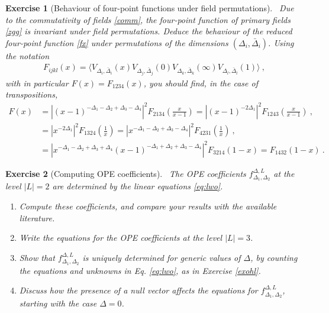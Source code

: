 \documentclass[12pt, a4paper, notitlepage, twoside]{report}
\numberwithin{equation}{section}
\theoremstyle{break}
\newtheorem{exo}{Exercise}[chapter]
\begin{document}
\begin{exo}[Behaviour of four-point functions under field permutations]
 ~\label{exoperm}
Due to the commutativity of fields \eqref{comm}, the four-point function of primary fields \eqref{zgg} is invariant under field permutations. Deduce the behaviour of the reduced four-point function \eqref{fx} under permutations of the dimensions $(\Delta_i,\bar \Delta_i)$. Using the notation 
\begin{align}
 F_{ijkl}(x) =\Big\langle V_{\Delta_i,\bar\Delta_i}(x)V_{\Delta_j,\bar\Delta_j}(0)V_{\Delta_k,\bar\Delta_k}(\infty) V_{\Delta_l,\bar\Delta_l}(1)\Big\rangle \ ,
\end{align}
with in particular $F(x) = F_{1234}(x)$, you should find, in the case of transpositions, 
\begin{align}
 F(x) 
 &= \left|(x-1)^{-\Delta_1-\Delta_2+\Delta_3-\Delta_4}\right|^2 F_{2134}\left(\tfrac{x}{x-1}\right)
 =\left|(x-1)^{-2\Delta_1}\right|^2 F_{1243}\left(\tfrac{x}{x-1}\right)\ ,
 \label{ftotf}
 \\
 & = \left|x^{-2\Delta_1}\right|^2 F_{1324}\left(\tfrac{1}{x}\right) 
  = \left|x^{-\Delta_1-\Delta_2+\Delta_3-\Delta_4}\right|^2 F_{4231}\left(\tfrac{1}{x}\right) 
  \ ,
  \\
&  = \left|x^{-\Delta_1-\Delta_2+\Delta_3+\Delta_4}(x-1)^{-\Delta_1+\Delta_2+\Delta_3-\Delta_4}\right|^2 F_{3214}(1-x)
  = F_{1432}(1-x)\ .
\end{align}
\end{exo}


\begin{exo}[Computing OPE coefficients]
 ~\label{exohf}
The OPE coefficients $f^{\Delta,L}_{\Delta_1,\Delta_2}$ at the level $|L|= 2$ are determined by the linear equations \eqref{eq:lwo}.
\begin{enumerate}
 \item Compute these coefficients,
and compare your results with the available literature.
\item
Write the equations for the OPE coefficients at the level $|L|=3$. 
\item
Show that $f^{\Delta,L}_{\Delta_1,\Delta_2}$ is uniquely determined for generic values of $\Delta$, 
by counting the equations and unknowns in Eq. \eqref{eq:lwo}, as in Exercise \ref{exohl}.
\item
Discuss how the presence of a null vector affects the equations for $f^{\Delta,L}_{\Delta_1,\Delta_2}$, starting with the case $\Delta=0$. 
\end{enumerate}
\end{exo}
\end{document}
